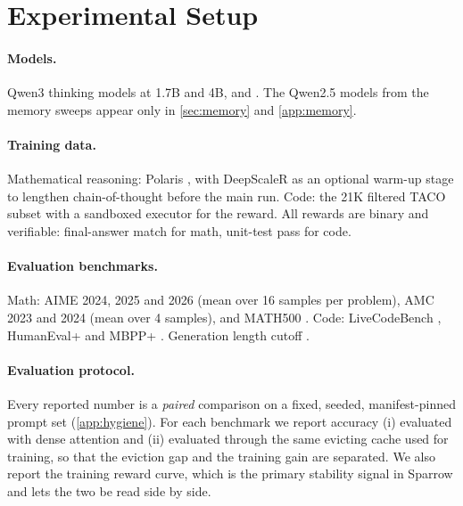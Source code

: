 \section{Experimental Setup}
\label{sec:setup}


\paragraph{Models.}
Qwen3 thinking models \citep{yang2025qwen3} at 1.7B and 4B, and
.  The Qwen2.5 models from the memory sweeps
\citep{qwen2025qwen25} appear only in \cref{sec:memory} and \cref{app:memory}.

\paragraph{Training data.}
Mathematical reasoning: Polaris \citep{an2025polaris}, with DeepScaleR
\citep{luo2025deepscaler} as an optional warm-up stage to lengthen
chain-of-thought before the main run. Code: the 21K filtered TACO subset
\citep{li2023taco} with a sandboxed executor for the reward. All rewards are
binary and verifiable: final-answer match for math, unit-test pass for code.

\paragraph{Evaluation benchmarks.}
Math: AIME 2024, 2025 and 2026 (mean over 16 samples per problem), AMC 2023
and 2024 (mean over 4 samples), and MATH500 \citep{lightman2023letsverify}.
Code: LiveCodeBench \citep{jain2024livecodebench}, HumanEval+ and MBPP+
\citep{liu2023evalplus}. 
Generation length cutoff .

\paragraph{Evaluation protocol.}
Every reported number is a \emph{paired} comparison on a fixed, seeded,
manifest-pinned prompt set (\cref{app:hygiene}). For each benchmark we report
accuracy (i) evaluated with dense attention and (ii) evaluated through the
same evicting cache used for training, so that the eviction gap and the
training gain are separated. We also report the training reward curve, which
is the primary stability signal in Sparrow and lets the two be read side by
side.

